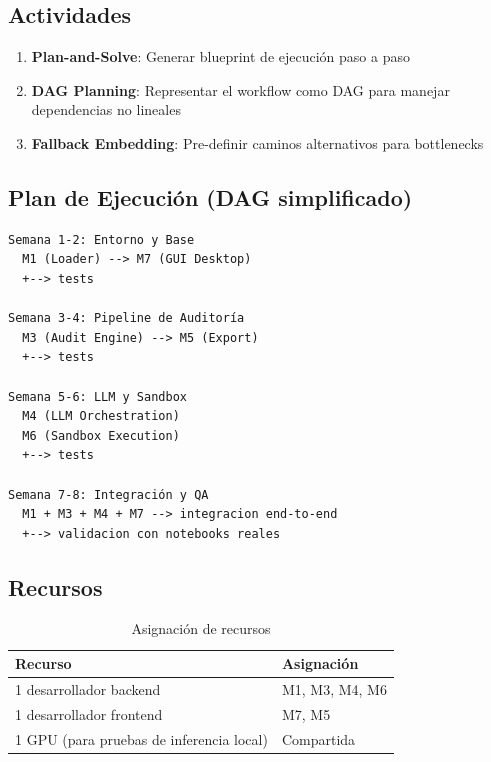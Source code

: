 \documentclass[12pt,a4paper]{article}
\begin{document}
\subsection*{Actividades}
\begin{enumerate}
  \item \textbf{Plan-and-Solve}: Generar blueprint de ejecución paso a paso
  \item \textbf{DAG Planning}: Representar el workflow como DAG para manejar dependencias no lineales
  \item \textbf{Fallback Embedding}: Pre-definir caminos alternativos para bottlenecks
\end{enumerate}

\subsection*{Plan de Ejecución (DAG simplificado)}

\begin{verbatim}
Semana 1-2: Entorno y Base
  M1 (Loader) --> M7 (GUI Desktop)
  +--> tests

Semana 3-4: Pipeline de Auditoría
  M3 (Audit Engine) --> M5 (Export)
  +--> tests

Semana 5-6: LLM y Sandbox
  M4 (LLM Orchestration)
  M6 (Sandbox Execution)
  +--> tests

Semana 7-8: Integración y QA
  M1 + M3 + M4 + M7 --> integracion end-to-end
  +--> validacion con notebooks reales
\end{verbatim}

\subsection*{Recursos}
\begin{table}[h]
\centering
\begin{tabular}{ll}
\toprule
\textbf{Recurso} & \textbf{Asignación} \\
\midrule
1 desarrollador backend  & M1, M3, M4, M6 \\
1 desarrollador frontend & M7, M5 \\
1 GPU (para pruebas de inferencia local) & Compartida \\
\bottomrule
\end{tabular}
\caption{Asignación de recursos}
\end{table}
\end{document}
